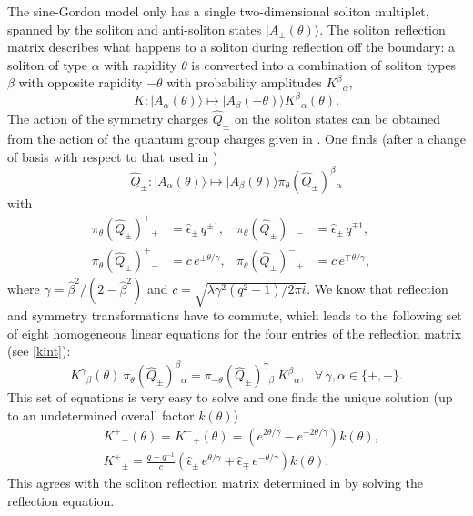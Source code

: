 \documentclass[a4paper,12pt]{article}
\newcommand{\hb}{\hat{\beta}}
\numberwithin{equation}{section}
\begin{document}
The sine-Gordon model only has a single two-dimensional soliton
multiplet, spanned by the soliton and anti-soliton states
$|A_\pm(\theta)\rangle$. The soliton reflection matrix describes
what happens to a soliton during reflection off the boundary: a
soliton of type $\alpha$ with rapidity $\theta$ is converted into
a combination of soliton types $\beta$ with opposite rapidity
$-\theta$ with probability amplitudes $K^\beta{}_\alpha$,
\begin{equation}
  K:|A_\alpha(\theta)\rangle\mapsto|A_\beta(-\theta)\rangle
  K^\beta{}_\alpha(\theta).
\end{equation}
The action of the symmetry charges $\hat{Q}_\pm$ on the soliton
states can be obtained from the action of the quantum group
charges given in \cite{Ber91}. One finds (after a change of basis
with respect to that used in \cite{Ber91})
\begin{equation}
  \hat{Q}_\pm:|A_\alpha(\theta)\rangle\mapsto|A_\beta(\theta)\rangle
  \pi_\theta(\hat{Q}_\pm)^\beta{}_\alpha
\end{equation}
with
\begin{align}
  \pi_\theta(\hat{Q}_\pm)^+{}_+&=\hat{\epsilon}_\pm\,q^{\pm 1},&
  \pi_\theta(\hat{Q}_\pm)^-{}_-&=\hat{\epsilon}_\pm\,q^{\mp 1},\\
  \pi_\theta(\hat{Q}_\pm)^+{}_-&=c\,e^{\pm\theta/\gamma},&
  \pi_\theta(\hat{Q}_\pm)^-{}_+&=c\,e^{\mp\theta/\gamma},&
\end{align}
where $\gamma=\hb^2/(2-\hb^2)$ and
$c=\sqrt{\lambda\gamma^2(q^2-1)/2\pi i}$. We know that reflection
and symmetry transformations have to commute, which leads to the
following set of eight homogeneous linear equations for the four
entries of the reflection matrix (see \eqref{kint}):
\begin{equation}
  K^\gamma{}_\beta(\theta)\ \pi_\theta(\hat{Q}_\pm)^\beta{}_\alpha=
  \pi_{-\theta}(\hat{Q}_\pm)^\gamma{}_\beta\  K^\beta{}_\alpha,
  ~~~\forall\,\gamma,\alpha\in\{+,-\}.
\end{equation}
This set of equations is very easy to solve and one finds the
unique solution (up to an undetermined overall factor $k(\theta)$)
\begin{align}
  &K^+{}_-(\theta)=K^-{}_+(\theta)=
  \left(e^{2\theta/\gamma}-e^{-2\theta/\gamma}\right)k(\theta),\\
  &K^\pm{}_\pm=\frac{q-q^{-1}}{c}
  \left(\hat{\epsilon}_\pm\,e^{\theta/\gamma}+
  \hat{\epsilon}_\mp\,e^{-\theta/\gamma}\right)k(\theta).
\end{align}
This agrees with the soliton reflection matrix determined in
\cite{Gho94} by solving the reflection equation.
\end{document}
